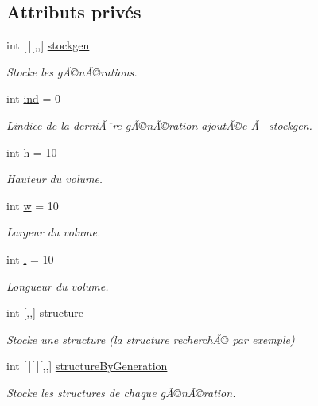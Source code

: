 \subsection*{Attributs privés}
\begin{DoxyCompactItemize}
\item 
int \mbox{[}$\,$\mbox{]}\mbox{[},,\mbox{]} \mbox{\hyperlink{class_detection_ad90b57df50e957490ef10ec0ca151680}{stockgen}}
\begin{DoxyCompactList}\small\item\em Stocke les gÃ©nÃ©rations. \end{DoxyCompactList}\item 
int \mbox{\hyperlink{class_detection_ac2c7885d3e4d086504e66eb365207c1e}{ind}} = 0
\begin{DoxyCompactList}\small\item\em L\textquotesingle{}indice de la derniÃ¨re gÃ©nÃ©ration ajoutÃ©e Ã  stockgen. \end{DoxyCompactList}\item 
int \mbox{\hyperlink{class_detection_ae2432d029788c3aa58e832716a7832e4}{h}} = 10
\begin{DoxyCompactList}\small\item\em Hauteur du volume. \end{DoxyCompactList}\item 
int \mbox{\hyperlink{class_detection_a15fdbc0a47657ec7c4bf5228a950079d}{w}} = 10
\begin{DoxyCompactList}\small\item\em Largeur du volume. \end{DoxyCompactList}\item 
int \mbox{\hyperlink{class_detection_a22ac4a8c7bfff75ddde6599e2868383d}{l}} = 10
\begin{DoxyCompactList}\small\item\em Longueur du volume. \end{DoxyCompactList}\item 
int \mbox{[},,\mbox{]} \mbox{\hyperlink{class_detection_a87b658cb3620885f810fb260efbb4b10}{structure}}
\begin{DoxyCompactList}\small\item\em Stocke une structure (la structure recherchÃ© par exemple) \end{DoxyCompactList}\item 
int \mbox{[}$\,$\mbox{]}\mbox{[}$\,$\mbox{]}\mbox{[},,\mbox{]} \mbox{\hyperlink{class_detection_abdc02d1290b7db51b15359c23b7d8b7a}{structure\+By\+Generation}}
\begin{DoxyCompactList}\small\item\em Stocke les structures de chaque gÃ©nÃ©ration. \end{DoxyCompactList}\item 

\end{DoxyCompactItemize}
